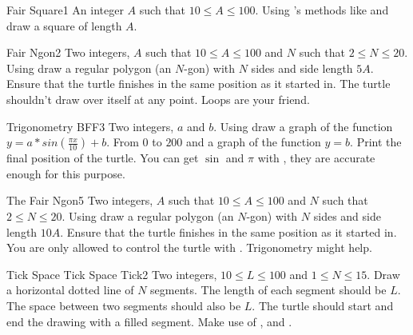 \begin{task}{Fair Square}{1}
\In
An integer $A$ such that $10 \leq A \leq 100$.
\Out
Using 's methods like 
 and  draw a square of length $A$.
\end{task}

\begin{task}{Fair Ngon}{2}
\In
Two integers, $A$ such that $10 \leq A \leq 100$ and $N$
such that $2 \leq N \leq 20$.
\Out
Using  draw a regular polygon (an $N$-gon) with $N$ sides and side
length $5A$. Ensure that the turtle finishes in the same position as it started
in. The turtle shouldn't draw over itself at any point.
\Hint
Loops are your friend.
\end{task}

\begin{task}{Trigonometry BFF}{3}
\In
Two integers, $a$ and $b$.
\Out
Using  draw a graph of the function $y = a * sin(\frac{\pi x}{10}) + b$.
From $0$ to $200$ and a graph of the function $y = b$. Print the final position
of the turtle.
\Hint
You can get $\sin$ and $\pi$ with , they are accurate
enough for this purpose.
\end{task}

\begin{task}{The Fair Ngon}{5}
\In
Two integers, $A$ such that $10 \leq A \leq 100$ and $N$
such that $2 \leq N \leq 20$.
\Out
Using  draw a regular polygon (an $N$-gon) with $N$ sides and side
length $10A$. Ensure that the turtle finishes in the same position as it started
in. You are only allowed to control the turtle with .
\Hint
Trigonometry might help.
\end{task}

\begin{task}{Tick Space Tick Space Tick}{2}
\In
Two integers, $10 \leq L \leq 100$ and $1 \leq N \leq 15$.
\Out
Draw a horizontal dotted line of $N$ segments. 
The length of each segment should be $L$.
The space between two segments should also be $L$.
\Note
The turtle should start and end the drawing with a filled segment.
\Hint
Make use of ,  and .
\end{task}

